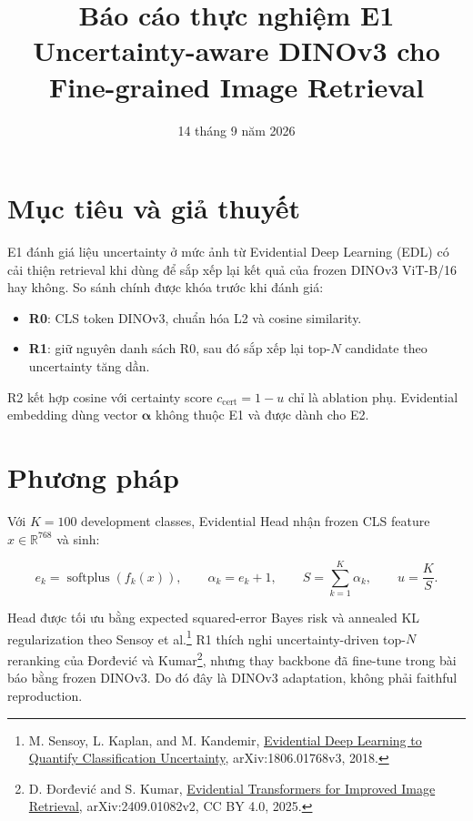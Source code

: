 \documentclass[11pt,a4paper]{article}
\title{Báo cáo thực nghiệm E1\\
Uncertainty-aware DINOv3 cho Fine-grained Image Retrieval}
\author{}
\date{14 tháng 9 năm 2026}
\begin{document}
\maketitle

\section{Mục tiêu và giả thuyết}

E1 đánh giá liệu uncertainty ở mức ảnh từ Evidential Deep Learning (EDL)
có cải thiện retrieval khi dùng để sắp xếp lại kết quả của frozen DINOv3
ViT-B/16 hay không. So sánh chính được khóa trước khi đánh giá:

\begin{itemize}
    \item \textbf{R0}: CLS token DINOv3, chuẩn hóa L2 và cosine similarity.
    \item \textbf{R1}: giữ nguyên danh sách R0, sau đó sắp xếp lại top-$N$
    candidate theo uncertainty tăng dần.
\end{itemize}

R2 kết hợp cosine với certainty score $c_{\mathrm{cert}}=1-u$ chỉ là
ablation phụ. Evidential embedding dùng vector $\boldsymbol{\alpha}$ không
thuộc E1 và được dành cho E2.

\section{Phương pháp}

Với $K=100$ development classes, Evidential Head nhận frozen CLS feature
$x\in\mathbb{R}^{768}$ và sinh:

\begin{equation}
e_k=\operatorname{softplus}(f_k(x)),\qquad
\alpha_k=e_k+1,\qquad
S=\sum_{k=1}^{K}\alpha_k,\qquad
u=\frac{K}{S}.
\end{equation}

Head được tối ưu bằng expected squared-error Bayes risk và annealed KL
regularization theo Sensoy et al.\footnote{M. Sensoy, L. Kaplan, and
M. Kandemir, \href{https://arxiv.org/abs/1806.01768v3}
{Evidential Deep Learning to Quantify Classification Uncertainty},
arXiv:1806.01768v3, 2018.} R1 thích nghi uncertainty-driven top-$N$
reranking của Đorđević và Kumar\footnote{D. Đorđević and S. Kumar,
\href{https://arxiv.org/abs/2409.01082v2}
{Evidential Transformers for Improved Image Retrieval},
arXiv:2409.01082v2, CC BY 4.0, 2025.}, nhưng thay backbone đã fine-tune
trong bài báo bằng frozen DINOv3. Do đó đây là DINOv3 adaptation, không
phải faithful reproduction.
\end{document}

